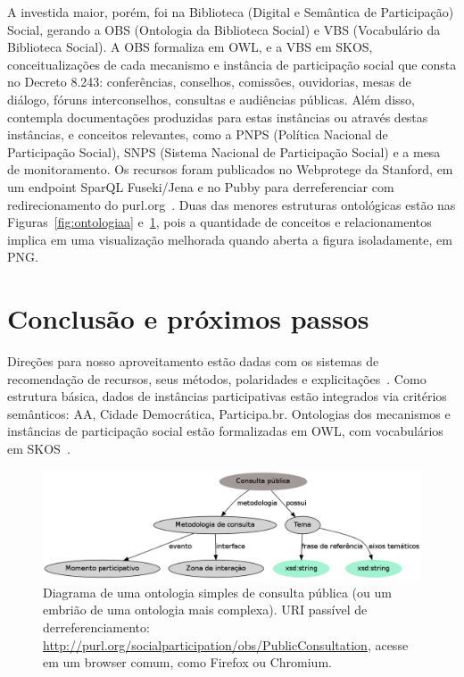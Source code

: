 \documentclass[a4paper, 11pt]{article} %
\begin{document}
A investida maior, porém, foi na Biblioteca (Digital e Semântica de Participação) Social, gerando a OBS (Ontologia da Biblioteca Social) e VBS (Vocabulário da Biblioteca Social). A OBS formaliza em OWL, e a VBS em SKOS, conceitualizações de cada mecanismo e instância de participação social que consta no Decreto 8.243: conferências, conselhos, comissões, ouvidorias, mesas de diálogo, fóruns interconselhos, consultas e audiências públicas. Além disso, contempla documentações produzidas para estas instâncias ou através destas instâncias, e conceitos relevantes, como a PNPS (Política Nacional de Participação Social), SNPS (Sistema Nacional de Participação Social) e a mesa de monitoramento. Os recursos foram publicados no Webprotege da Stanford, em um endpoint SparQL Fuseki/Jena e no Pubby para derreferenciar com redirecionamento do purl.org~\cite{pnud5}. Duas das menores estruturas ontológicas estão nas Figuras~\ref{fig:ontologiaa} e~\ref{fig:consulta}, pois a quantidade de conceitos e relacionamentos implica em uma visualização melhorada quando aberta a figura isoladamente, em PNG.


\section*{Conclusão e próximos passos}

Direções para nosso aproveitamento estão dadas com os sistemas de recomendação de recursos, seus métodos, polaridades e explicitações~\cite{pnud4}. Como estrutura básica, dados de instâncias participativas estão integrados via critérios semânticos: AA, Cidade Democrática, Participa.br. Ontologias dos mecanismos e instâncias de participação social estão formalizadas em OWL, com vocabulários em SKOS~\cite{pnud5}.
\begin{figure}[h!]
  \centering
    \includegraphics[width=1.\textwidth]{obsConsulta.png}
  \caption{\small Diagrama de uma ontologia simples de consulta pública (ou um embrião de uma ontologia mais complexa). URI passível de derreferenciamento: \url{http://purl.org/socialparticipation/obs/PublicConsultation}, acesse em um browser comum, como Firefox ou Chromium.}\label{fig:consulta}
\end{figure}
\end{document}
